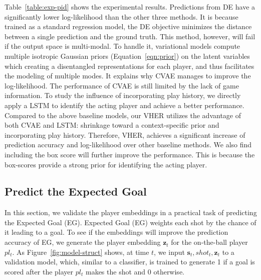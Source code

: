 \documentclass[letterpaper]{article} %
\newcommand{\latentvariables}{\mathbf{z}}
\newcommand{\state}{\mathbf{s}}
\newcommand{\player}{pl}
\begin{document}
Table~\ref{table:exp-pid} shows the experimental results. Predictions from DE have a significantly lower log-likelihood than the other three methods. 
It is because trained as a standard regression model, the DE objective minimizes the distance between a single prediction and the ground truth. This method, however, will fail if the output space is multi-modal.
To handle it, variational models compute multiple isotropic Gaussian priors (Equation~\ref{eqn:prior}) on the latent variables which creating a disentangled representations for each player, and thus facilitates the modeling of multiple modes.
It explains why CVAE manages to improve the log-likelihood. The performance of CVAE is still limited by the lack of game information. To study the influence of incorporating play history, we directly apply a LSTM to identify the acting player and  achieve a better performance. 
Compared to the above baseline models, our VHER utilizes the advantage of both CVAE and LSTM: shrinkage toward a context-specific prior and incorporating play history. 
Therefore, VHER, achieves a significant increase of prediction accuracy and log-likelihood over other baseline methods. We also find including the box score will further improve the performance. This is because the box-scores provide a strong prior for identifying the acting player. 

\subsection{Predict the Expected Goal}

In this section, we validate the player embeddings in a practical task of predicting the Expected Goal (EG).
Expected Goal (EG) weights each shot by the chance of it leading to a goal. To see if the embeddings will improve the prediction accuracy of EG, we generate the player embedding $\latentvariables_{t}$ for the on-the-ball player $\player_{t}$.
As Figure~\ref{fig:model-struct} shows, at time $t$, we input $\state_{t},shot_{t},\latentvariables_{t}$ to a validation model, which, similar to a classifier, is trained to generate 1 if a goal is scored after the player $\player_{t}$ makes the shot and 0 otherwise. 
\end{document}
